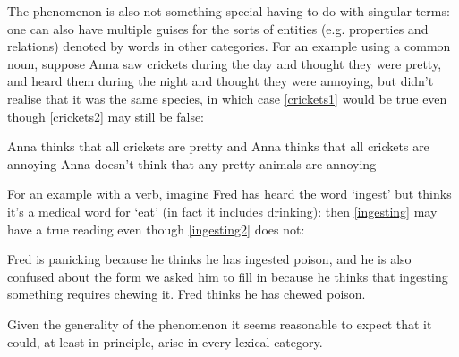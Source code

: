 \documentclass[If.tex]{subfiles}
\begin{document}
The phenomenon is also not something special having to do with singular terms: one can also have multiple guises for the sorts of entities (e.g. properties and relations) denoted by words in other categories.  For an example using a common noun, suppose Anna saw crickets during the day and thought they were pretty, and heard them during the night and thought they were annoying, but didn't realise that it was the same species, in which case \ref{crickets1} would be true even though \ref{crickets2} may still be false:
\begin{prop}
    \nitem \label{crickets2}
    Anna thinks that all crickets are pretty and Anna thinks that all crickets are annoying
    \nitem
    Anna doesn't think that any pretty animals are annoying 
\end{prop}
For an example with a verb, imagine Fred has heard the word ‘ingest’ but thinks it's a medical word for ‘eat’ (in fact it includes drinking): then \ref{ingesting} may have a true reading even though \ref{ingesting2} does not:
\begin{prop}
    \nitem
    \begin{prop}
        \aitem \label{ingesting}
    Fred is panicking because he thinks he has ingested poison, and he is also confused about the form we asked him to fill in because he thinks that ingesting something requires chewing it.
    \aitem \label{ingest2}
    Fred thinks he has chewed poison.
        \end{prop}
\end{prop}
Given the generality of the phenomenon it seems reasonable to expect that it could, at least in principle, arise in every lexical category.  
\end{document}
